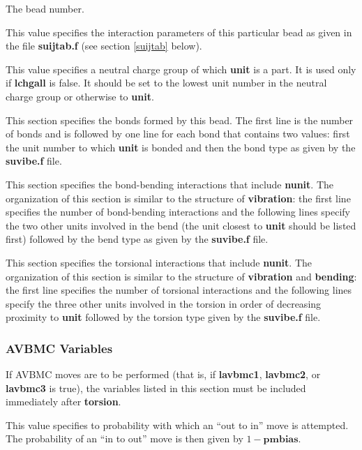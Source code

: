 \documentclass[12pt,letterpaper]{article}
\begin{document}
 The bead number.

 This value specifies the interaction parameters of this
particular bead as given in the file {\textbf{suijtab.f}} (see section \ref{suijtab} below).

 This value specifies a neutral charge group of which {\textbf{unit}} is a part.  
It is used only if {\textbf{lchgall}} is false.
It should be set to the lowest unit number in the neutral charge group 
or otherwise to {\textbf{unit}}.

 This section specifies the bonds formed by this bead.
The first line is the number of bonds and is followed by one line for each bond
that contains two values: first the unit number to which {\textbf{unit}} is bonded 
and then the bond type as given by the {\textbf{suvibe.f}} file.

 This section specifies the bond-bending
interactions that include {\textbf{nunit}}.  The organization of this section is similar 
to the structure of {\textbf{vibration}}:
the first line specifies the number of bond-bending interactions and 
the following lines specify the two other units involved in the bend (the unit closest to {\textbf{unit}} 
should be listed first) followed by the bend type as given by the {\textbf{suvibe.f}} file.

 This section specifies the torsional interactions 
that include {\textbf{nunit}}.  The organization of this section is similar 
to the structure of {\textbf{vibration}} and {\textbf{bending}}:
the first line specifies the number of torsional interactions and 
the following lines specify the three other units involved in the torsion 
in order of decreasing proximity to {\textbf{unit}} followed by the torsion type given by
the {\textbf{suvibe.f}} file.

\subsubsection{AVBMC Variables}
\label{avbmc_vars}

If AVBMC moves are to be performed (that is, if {\textbf{lavbmc1}}, {\textbf{lavbmc2}},
or {\textbf{lavbmc3}} is true), the variables listed in this section must be included immediately after {\bf torsion}.

 This value specifies to probability with which an 
``out to in'' move is attempted.  The probability of an ``in to out'' move is then given by 
$1 - {\textbf{pmbias}}$.
\end{document}
